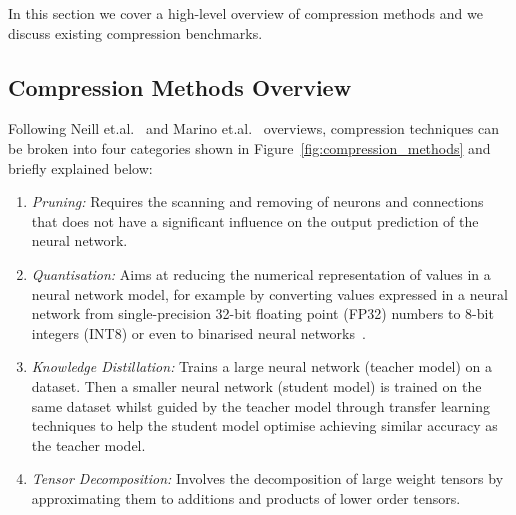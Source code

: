 
In this section we cover a high-level overview of compression methods and we discuss existing compression benchmarks.%

\subsection{Compression Methods Overview}
Following Neill et.al.~\cite{Neill2020} and Marino et.al.~\cite{Marino2023} overviews, compression techniques can be broken into four categories shown in Figure~\ref{fig:compression_methods} and briefly explained below:
\begin{enumerate}
    \item \textit{Pruning:} Requires the scanning and removing of neurons and connections that does not have a significant influence on the output prediction of the neural network.

    \item \textit{Quantisation:} Aims at reducing the numerical representation of values in a neural network model, for example by converting values expressed in a neural network from single-precision 32-bit floating point (FP32) numbers to 8-bit integers (INT8) or even to binarised neural networks~\cite{BNNs,TNNs}.

    \item \textit{Knowledge Distillation:} Trains a large neural network (teacher model) on a dataset. Then a smaller neural network (student model) is trained on the same dataset whilst guided by the teacher model through transfer learning techniques to help the student model optimise achieving similar accuracy as the teacher model.

    \item \textit{Tensor Decomposition:} Involves the decomposition of large weight tensors by approximating them to additions and products of lower order tensors.
      
\end{enumerate}

